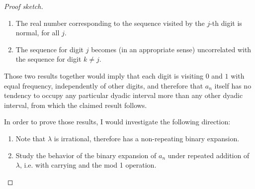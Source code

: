 \begin{enumerate}[label=(5.\arabic*)]
\begin{proof}[Proof sketch]
    \begin{enumerate}
    \item The real number corresponding to the sequence visited by the $j$-th digit is normal, for all $j$.
    \item The sequence for digit $j$ becomes (in an appropriate sense) uncorrelated with the sequence for
      digit $k \neq j$.
    \end{enumerate}

    Those two results together would imply that each digit is visiting $0$ and $1$ with equal frequency,
    independently of other digits, and therefore that $a_n$ itself has no tendency to occupy any particular
    dyadic interval more than any other dyadic interval, from which the claimed result follows.

    In order to prove those results, I would investigate the following direction:
    \begin{enumerate}
    \item Note that $\lambda$ is irrational, therefore has a non-repeating binary expansion.

    \item Study the behavior of the binary expansion of $a_n$ under repeated addition of $\lambda$, i.e. with carrying and the mod 1 operation.
    \end{enumerate}
  \end{proof}
\end{enumerate}
